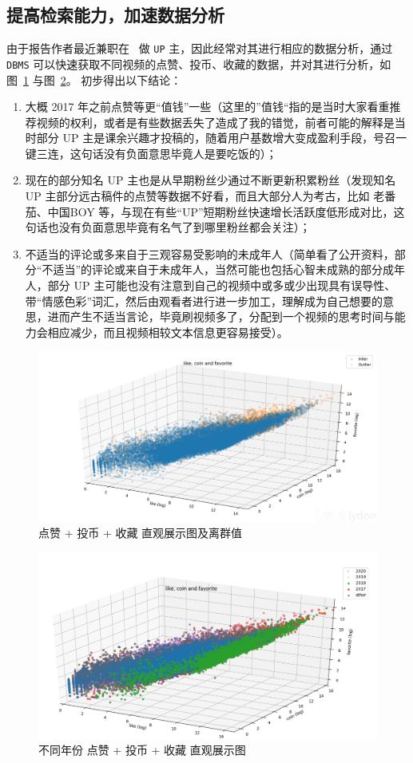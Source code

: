 \subsection{提高检索能力，加速数据分析}
由于报告作者最近兼职在 \bilibili\ 做 \texttt{UP} 主，因此经常对其进行相应的数据分析，通过 \texttt{DBMS} 可以快速获取不同视频的点赞、投币、收藏的数据，并对其进行分析，如图~\ref{F:like-coin-favorite} 与图~\ref{F:like-coin-favorite-2}。
初步得出以下结论：
\begin{enumerate}
    \item 大概 2017 年之前点赞等更“值钱”一些（这里的”值钱“指的是当时大家看重推荐视频的权利，或者是有些数据丢失了造成了我的错觉，前者可能的解释是当时部分 UP 主是课余兴趣才投稿的，随着用户基数增大变成盈利手段，号召一键三连，这句话没有负面意思毕竟人是要吃饭的）；
    \item 现在的部分知名 UP 主也是从早期粉丝少通过不断更新积累粉丝（发现知名 UP 主部分远古稿件的点赞等数据不好看，而且大部分人为考古，比如 老番茄、中国BOY 等，与现在有些“UP”短期粉丝快速增长活跃度低形成对比，这句话也没有负面意思毕竟有名气了到哪里粉丝都会关注）；
    \item     不适当的评论或多来自于三观容易受影响的未成年人（简单看了公开资料，部分“不适当”的评论或来自于未成年人，当然可能也包括心智未成熟的部分成年人，部分 UP 主可能也没有注意到自己的视频中或多或少出现具有误导性、带“情感色彩”词汇，然后由观看者进行进一步加工，理解成为自己想要的意思，进而产生不适当言论，毕竟刷视频多了，分配到一个视频的思考时间与能力会相应减少，而且视频相较文本信息更容易接受）。
\end{enumerate}

\begin{figure}[H]
    \centering
    \includegraphics[width=.7\textwidth]{figures/like_coin_favorite.png}
    \caption{点赞 + 投币 + 收藏 直观展示图及离群值}\label{F:like-coin-favorite}
\end{figure}

\begin{figure}[H]
    \centering
    \includegraphics[width=.7\textwidth]{figures/like_coin_favorite-2.png}
    \caption{不同年份 点赞 + 投币 + 收藏 直观展示图}\label{F:like-coin-favorite-2}
\end{figure}

